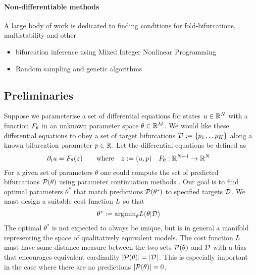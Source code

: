 \paragraph{Non-differentiable methods} 
A large body of work is dedicated to finding conditions for fold-bifurcations, multistability and other

\begin{itemize}
    \item bifurcation inference using Mixed Integer Nonlinear Programming \cite{Otero-Muras2018Optimization-basedModels}
    \item Random sampling and genetic algorithms \cite{Chickarmane2005BifurcationTool,Conrad2006BifurcationClock}
\end{itemize}

\subsection{Preliminaries}
Suppose we parameterise a set of differential equations for states $u\in\mathbb{R}^N$ with a function $F_{\theta}$ in an unknown parameter space $\theta\in\mathbb{R}^M$. We would like these differential equations to obey a set of target bifurcations $\mathcal{D}:=\{p_1\dots p_K\}$ along a known bifurcation parameter $p\in\mathbb{R}$. Let the differential equations be defined as
\begin{align}
	\partial_t u=F_{\theta}(z)
	\qquad\mathrm{where}\quad z:=(u,p)\quad
	F_{\theta} : \mathbb{R}^{N+1}\rightarrow\mathbb{R}^N
	\label{eq:model}
\end{align}
For a given set of parameters $\theta$ one could compute the set of predicted bifurcations $\mathcal{P}(\theta)$ using parameter continuation methods \cite{Veltz2019PseudoArcLengthContinuation.jl,Farrell2016TheDiagrams}. Our goal is to find optimal parameters $\theta^*$ that match predictions $\mathcal{P}(\theta^*)$ to specified targets $\mathcal{D}$. We must design a suitable cost function $L$ so that
\begin{align}
    \theta^* := \mathrm{argmin}_{\theta} L(\theta|\mathcal{D})
    \label{eq:optimal-theta}
\end{align}
The optimal $\theta^*$ is not expected to always be unique, but is in general a manifold representing the space of qualitatively equivalent models. The cost function $L$ must have some distance measure between the two sets $\mathcal{P}(\theta)$ and $\mathcal{D}$ with a bias that encourages equivalent cardinality $|\mathcal{P}(\theta)|=|\mathcal{D}|$. This is especially important in the case where there are no predictions $|\mathcal{P}(\theta)|=0$.

